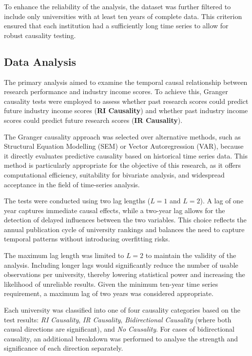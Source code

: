\documentclass[a4paper, conference]{IEEEtran}
\begin{document}
To enhance the reliability of the analysis, the dataset was further filtered to include only universities with at least ten years of complete data. This criterion ensured that each institution had a sufficiently long time series to allow for robust causality testing.

\subsection{Data Analysis}

The primary analysis aimed to examine the temporal causal relationship between research performance and industry income scores. To achieve this, Granger causality tests \cite{granger1969investigating} were employed to assess whether past research scores could predict future industry income scores (\textbf{RI Causality}) and whether past industry income scores could predict future research scores (\textbf{IR Causality}).

The Granger causality approach was selected over alternative methods, such as Structural Equation Modelling (SEM) or Vector Autoregression (VAR), because it directly evaluates predictive causality based on historical time series data. This method is particularly appropriate for the objective of this research, as it offers computational efficiency, suitability for bivariate analysis, and widespread acceptance in the field of time-series analysis.

The tests were conducted using two lag lengths ($L=1$ and $L=2$). A lag of one year captures immediate causal effects, while a two-year lag allows for the detection of delayed influences between the two variables. This choice reflects the annual publication cycle of university rankings and balances the need to capture temporal patterns without introducing overfitting risks.

The maximum lag length was limited to $L=2$ to maintain the validity of the analysis. Including longer lags would significantly reduce the number of usable observations per university, thereby lowering statistical power and increasing the likelihood of unreliable results. Given the minimum ten-year time series requirement, a maximum lag of two years was considered appropriate.

Each university was classified into one of four causality categories based on the test results: \textit{RI Causality}, \textit{IR Causality}, \textit{Bidirectional Causality} (where both causal directions are significant), and \textit{No Causality}. For cases of bidirectional causality, an additional breakdown was performed to analyse the strength and significance of each direction separately.
\end{document}
